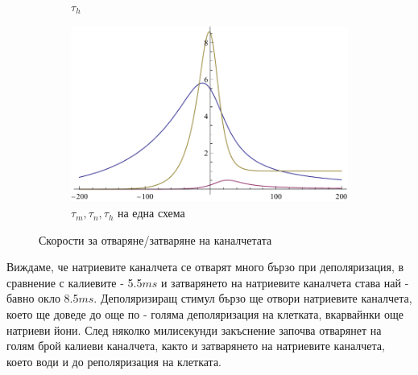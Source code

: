 \documentclass{article}
\numberwithin{equation}{section}
\begin{document}
\begin{figure}[H]
\begin{subfigure}[t]{0.3\textwidth}
            \caption{$\tau_h$}
        \end{subfigure}
        \begin{subfigure}[t]{0.3\textwidth}
            \includegraphics[width=\textwidth]{./schemas/tcomb.pdf}
            \caption{$ \tau_m, \tau_n, \tau_h$ на една схема}
        \end{subfigure}
        \caption{Скорости за отваряне/затваряне на каналчетата}\label{fig:chanel_prob}
    \end{figure}
    Виждаме, че натриевите каналчета се отварят много бързо при деполяризация, в сравнение с калиевите - 5.5$ms$ и затварянето на
    натриевите каналчета става най - бавно окло 8.5$ms$. Деполяризиращ стимул бързо ще отвори натриевите каналчета, което ще доведе до още
    по - голяма деполяризация на клетката, вкарвайнки още натриеви йони. След няколко милисекунди закъснение започва отварянет на голям брой калиеви каналчета, както и затварянето на натриевите каналчета, което води и до реполяризация на клетката.
    
\end{document}
